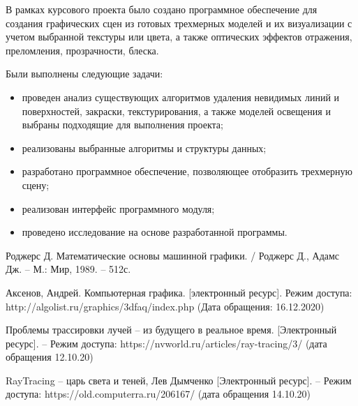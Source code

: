 \documentclass[12pt,a4paper,oneside]{report}
\begin{document}
	 \quad В рамках курсового проекта было создано программное обеспечение для создания графических сцен из готовых трехмерных моделей и их визуализации с учетом выбранной текстуры или цвета, а также оптических эффектов отражения, преломления, прозрачности, блеска. 
	
	 Были выполнены следующие задачи:
	\begin{itemize}
		\item проведен анализ существующих алгоритмов удаления невидимых линий и поверхностей, закраски, текстурирования, а также моделей освещения и выбраны подходящие для выполнения проекта;
		\item реализованы выбранные алгоритмы и структуры данных;
		\item разработано программное обеспечение, позволяющее отобразить трехмерную сцену;
		\item реализован интерфейс программного модуля;
		\item проведено исследование на основе разработанной программы. 
	\end{itemize}

	
	\renewcommand{\bibname}{Список использованной литературы}
	\begin{thebibliography}{2}
		 Роджерс Д. Математические основы машинной графики. / Роджерс Д., Адамс Дж.  – М.: Мир, 1989. – 512с. 
		
		 Аксенов, Андрей. Компьютерная графика.  [электронный ресурс]. Режим доступа:
		http://algolist.ru/graphics/3dfaq/index.php
		(Дата обращения: 16.12.2020)
		
		 Проблемы трассировки лучей – из будущего в реальное время. [Электронный ресурс]. – Режим доступа: https://nvworld.ru/articles/ray-tracing/3/ (дата обращения 12.10.20) 
		
		 RayTracing – царь света и теней, Лев Дымченко [Электронный ресурс]. – Режим доступа: https://old.computerra.ru/206167/ (дата обращения 14.10.20) 
			
	\end{thebibliography}
	
\end{document}
